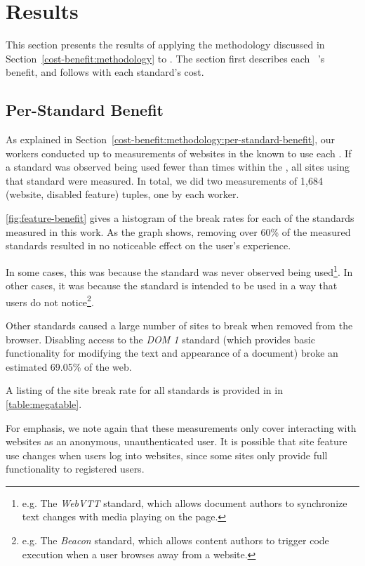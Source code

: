 \section{Results}
\label{cost-benefit:results}

This section presents the results of applying the methodology discussed in
Section~\ref{cost-benefit:methodology} to \FFWithVersion.  The section first
describes each \WAS~'s benefit, and follows with each standard's cost.




\subsection{Per-Standard Benefit}
\label{cost-benefit:results:results-benefit}

As explained in Section~\ref{cost-benefit:methodology:per-standard-benefit},
our workers conducted up to \NumSitesPerStandard measurements of websites in
the \ATK known to use each \WAS. If a standard was observed being used
fewer than \NumSitesPerStandard times within the \ATK, all sites using that
standard were measured. In total, we did two measurements of 1,684 (website,
disabled feature) tuples, one by each worker.

\ref{fig:feature-benefit} gives a histogram of the break rates for each of
the \NumStandards standards measured in this work.  As the graph shows, removing
over 60\% of the measured standards resulted in no noticeable effect on the
user's experience.

In some cases, this was because the standard was never observed being
used\footnote{e.g. The \textit{WebVTT} standard, which allows document authors
to synchronize text changes with media playing on the page.}.  In other cases,
it was because the standard is intended to be used in a way that users do not
notice\footnote{e.g. The \textit{Beacon} standard, which allows content authors
to trigger code execution when a user browses away from a website.}.

Other standards caused a large number of sites to break when removed from the
browser.  Disabling access to the \textit{DOM 1} standard (which provides basic
functionality for modifying the text and appearance of a document) broke an
estimated 69.05\% of the web.

A listing of the site break rate for all \NumStandards standards is provided in
in \ref{table:megatable}.

For emphasis, we note again that these measurements only cover interacting with
websites as an anonymous, unauthenticated user. It is possible that site
feature use changes when users log into websites, since some sites only provide
full functionality to registered users.


